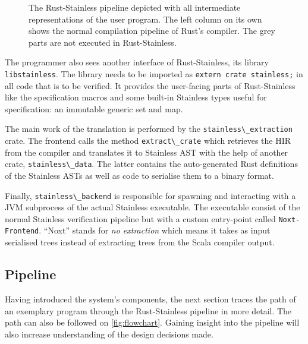 \begin{figure}
  \begin{center}
  
  \caption{
    The Rust-Stainless pipeline depicted with all intermediate representations
    of the user program. The left column on its own shows the normal compilation
    pipeline of Rust's compiler. The grey parts are not executed in Rust-Stainless.
  }
  \label{fig:flowchart}
  \end{center}
\end{figure}

The programmer also sees another interface of Rust-Stainless, its
library \lstinline!libstainless!. The library needs to be
imported as \passthrough{\lstinline!extern crate stainless;!} in all
code that is to be verified. It provides the user-facing parts of
Rust-Stainless like the specification macros and some built-in Stainless
types useful for specification: an immutable generic set and map.

The main work of the translation is performed by the
\passthrough{\lstinline!stainless\_extraction!} crate. The frontend
calls the method \passthrough{\lstinline!extract\_crate!} which
retrieves the HIR from the compiler and translates it to Stainless AST
with the help of another crate,
\passthrough{\lstinline!stainless\_data!}. The latter contains the
auto-generated Rust definitions of the Stainless ASTs as well as code to
serialise them to a binary format.

Finally, \passthrough{\lstinline!stainless\_backend!} is responsible for
spawning and interacting with a JVM subprocess of the actual Stainless
executable. The executable consist of the normal Stainless verification
pipeline but with a custom entry-point called
\passthrough{\lstinline!Noxt-Frontend!}. ``Noxt'' stands for \emph{no
extraction} which means it takes as input serialised trees instead of
extracting trees from the Scala compiler output.

\subsection{Pipeline}
\label{sec:pipeline}

Having introduced the system's components, the next section traces the path of
an exemplary program through the Rust-Stainless pipeline in more detail. The
path can also be followed on  \autoref{fig:flowchart}. Gaining insight into the
pipeline will also increase understanding of the design decisions made.

